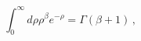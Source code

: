 \begin{equation}
\int_{0}^{\infty }d\rho \rho ^{\beta }e^{-\rho }=\Gamma \left( \beta
+1\right)\, ,
\end{equation}

